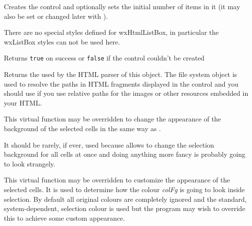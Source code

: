 Creates the control and optionally sets the initial number of items in it
(it may also be set or changed later with 
).

There are no special styles defined for wxHtmlListBox, in particular the
wxListBox styles can not be used here.

Returns {\tt true} on success or {\tt false} if the control couldn't be created


\label{wxhtmllistboxgetfilesystem}



Returns the  used by the HTML parser of
this object. The file system object is used to resolve the paths in HTML
fragments displayed in the control and you should use 
 if you use
relative paths for the images or other resources embedded in your HTML.


\label{wxhtmllistboxgetselectedtextbgcolour}


This virtual function may be overridden to change the appearance of the
background of the selected cells in the same way as 
.

It should be rarely, if ever, used because 
 allows to
change the selection background for all cells at once and doing anything more
fancy is probably going to look strangely.




\label{wxhtmllistboxgetselectedtextcolour}


This virtual function may be overridden to customize the appearance of the
selected cells. It is used to determine how the colour {\it colFg} is going to
look inside selection. By default all original colours are completely ignored
and the standard, system-dependent, selection colour is used but the program
may wish to override this to achieve some custom appearance.

